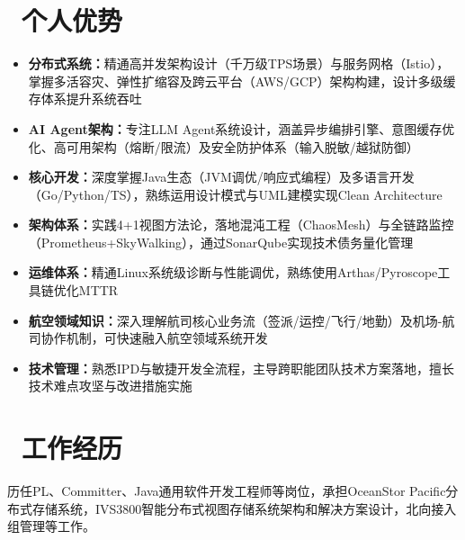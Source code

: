 \documentclass{resume}
\begin{document}




\section{\faStar\ 个人优势}
\begin{onehalfspacing}
  \begin{itemize}
    \item \textbf{分布式系统：}精通高并发架构设计（千万级TPS场景）与服务网格（Istio），掌握多活容灾、弹性扩缩容及跨云平台（AWS/GCP）架构构建，设计多级缓存体系提升系统吞吐
    \item \textbf{AI Agent架构：}专注LLM Agent系统设计，涵盖异步编排引擎、意图缓存优化、高可用架构（熔断/限流）及安全防护体系（输入脱敏/越狱防御）
    \item \textbf{核心开发：}深度掌握Java生态（JVM调优/响应式编程）及多语言开发（Go/Python/TS），熟练运用设计模式与UML建模实现Clean Architecture
    \item \textbf{架构体系：}实践4+1视图方法论，落地混沌工程（ChaosMesh）与全链路监控（Prometheus+SkyWalking），通过SonarQube实现技术债务量化管理
    \item \textbf{运维体系：}精通Linux系统级诊断与性能调优，熟练使用Arthas/Pyroscope工具链优化MTTR
    \item \textbf{航空领域知识：}深入理解航司核心业务流（签派/运控/飞行/地勤）及机场-航司协作机制，可快速融入航空领域系统开发
    \item \textbf{技术管理：}熟悉IPD与敏捷开发全流程，主导跨职能团队技术方案落地，擅长技术难点攻坚与改进措施实施
  \end{itemize}
\end{onehalfspacing}

\section{\faUsers\ 工作经历}
历任PL、Committer、Java通用软件开发工程师等岗位，承担OceanStor Pacific分布式存储系统，IVS3800智能分布式视图存储系统架构和解决方案设计，北向接入组管理等工作。
\end{document}
